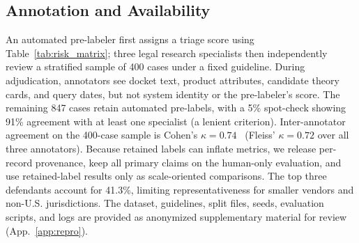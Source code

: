 \subsection{Annotation and Availability}
An automated pre-labeler first assigns a triage score using Table~\ref{tab:risk_matrix}; three legal research specialists then independently review a stratified sample of 400 cases under a fixed guideline. During adjudication, annotators see docket text, product attributes, candidate theory cards, and query dates, but not system identity or the pre-labeler's score. The remaining 847 cases retain automated pre-labels, with a 5\% spot-check showing 91\% agreement with at least one specialist (a lenient criterion). Inter-annotator agreement on the 400-case sample is Cohen's $\kappa=0.74$~\citep{landis1977kappa} (Fleiss' $\kappa=0.72$ over all three annotators). Because retained labels can inflate metrics, we release per-record provenance, keep all primary claims on the human-only evaluation, and use retained-label results only as scale-oriented comparisons. The top three defendants account for 41.3\%, limiting representativeness for smaller vendors and non-U.S. jurisdictions. The dataset, guidelines, split files, seeds, evaluation scripts, and logs are provided as anonymized supplementary material for review (App.~\ref{app:repro}).
